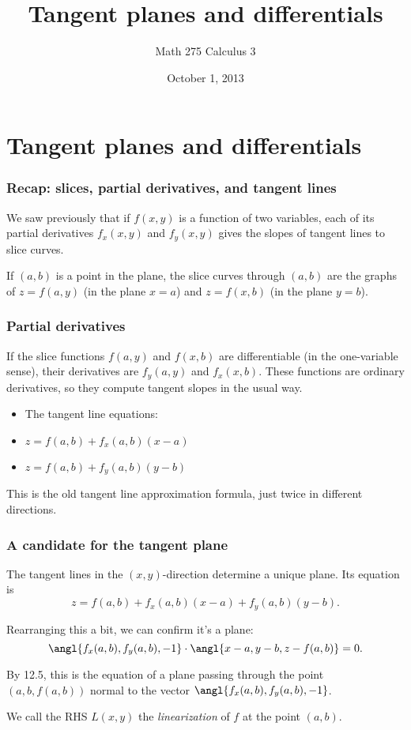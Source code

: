 \documentclass[11pt,ignorenonframetext,aspectratio=169,xcolor={svgnames}]{beamer}
\title{Tangent planes and differentials}
\author{Math 275 Calculus 3}
\date{October 1, 2013}
\begin{document}
\frame{\titlepage}

\section{Tangent planes and differentials}

\begin{frame}\frametitle{Recap: slices, partial derivatives, and tangent
lines}

We saw previously that if $f(x,y)$ is a function of two variables, each
of its partial derivatives $f_x(x,y)$ and $f_y(x,y)$ gives the slopes of
tangent lines to slice curves.

If $(a, b)$ is a point in the plane, the slice curves through $(a,b)$
are the graphs of $z = f(a, y)$ (in the plane $x = a$) and $z = f(x, b)$
(in the plane $y = b$).

\end{frame}

\begin{frame}\frametitle{Partial derivatives}

If the slice functions $f(a, y)$ and $f(x,b)$ are differentiable (in the
one-variable sense), their derivatives are $f_y(a,y)$ and $f_x(x,b)$.
These functions are ordinary derivatives, so they compute tangent slopes
in the usual way.

\begin{itemize}[<+->]

\item
  The tangent line equations:
\item
  $z = f(a, b) + f_x(a,b)(x - a)$
\item
  $z = f(a, b) + f_y(a,b)(y - b)$
\end{itemize}

This is the old tangent line approximation formula, just twice in
different directions.

\end{frame}

\begin{frame}\frametitle{A candidate for the tangent plane}

The tangent lines in the $(x,y)$-direction determine a unique plane. Its
equation is \[ z = f(a,b) + f_x(a,b)(x-a) + f_y(a,b)(y - b). \]

Rearranging this a bit, we can confirm it's a plane:
\[ \angl{f_x(a,b), f_y(a,b), -1} \cdot \angl{x - a, y - b, z - f(a,b)} = 0. \]

By 12.5, this is the equation of a plane passing through the point
$(a, b, f(a, b))$ normal to the vector $\angl{f_x(a,b), f_y(a,b), -1}$.

We call the RHS $L(x,y)$ the \emph{linearization} of $f$ at the point
$(a,b)$.

\end{frame}
\end{document}

